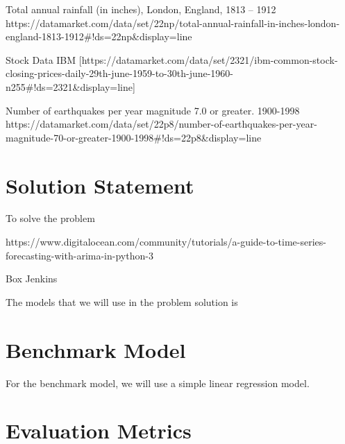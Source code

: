 \documentclass[10pt,a4paper]{article}
\begin{document}
Total annual rainfall (in inches), London, England, 1813 – 1912
https://datamarket.com/data/set/22np/total-annual-rainfall-in-inches-london-england-1813-1912#!ds=22np&display=line

Stock Data
IBM [https://datamarket.com/data/set/2321/ibm-common-stock-closing-prices-daily-29th-june-1959-to-30th-june-1960-n255#!ds=2321&display=line]

Number of earthquakes per year magnitude 7.0 or greater. 1900-1998
https://datamarket.com/data/set/22p8/number-of-earthquakes-per-year-magnitude-70-or-greater-1900-1998#!ds=22p8&display=line

\section{Solution Statement}


To solve the problem 

https://www.digitalocean.com/community/tutorials/a-guide-to-time-series-forecasting-with-arima-in-python-3

Box Jenkins 

The models that we will use in the problem solution is


\section{Benchmark Model}


For the benchmark model, we will use a simple linear regression model.


\section{Evaluation Metrics}
\end{document}
